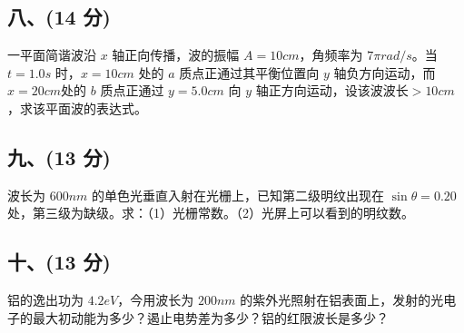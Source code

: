 \subsection{八、(14 分)}
一平面简谐波沿 $x$ 轴正向传播，波的振幅 $A=10cm$，角频率为 $7\pi rad/s$。当
$t=1.0s$ 时，$x=10cm$ 处的 $a$ 质点正通过其平衡位置向 $y$ 轴负方向运动，而 $x=20cm$处的 $b$ 质点正通过 $y=5.0cm$ 向 $y$ 轴正方向运动，设该波波长$>10cm$，求该平面波的表达式。
\subsection{九、(13 分)}
波长为 $600nm$ 的单色光垂直入射在光栅上，已知第二级明纹出现在 $\sin \theta=0.20$ 处，第三级为缺级。求：（1）光栅常数。（2）光屏上可以看到的明纹数。
\subsection{十、(13 分)}
铝的逸出功为 $4.2eV$，今用波长为 $200nm$ 的紫外光照射在铝表面上，发射的光电子的最大初动能为多少？遏止电势差为多少？铝的红限波长是多少？